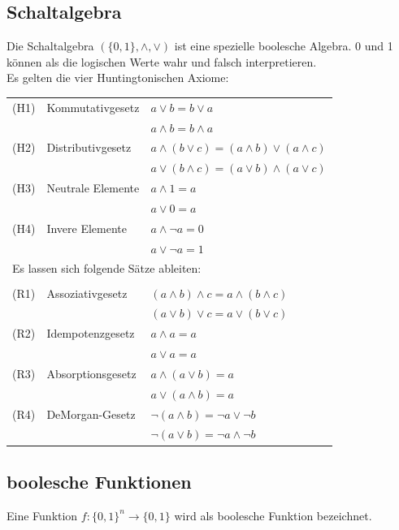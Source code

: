 \documentclass[12pt]{article}
\begin{document}
\subsection{Schaltalgebra}
Die Schaltalgebra $(\{0,1\}, \land, \lor)$ ist eine spezielle boolesche Algebra. 0 und 1 können als die logischen Werte wahr und falsch interpretieren. \\
Es gelten die vier Huntingtonischen Axiome: \\
\newline
\begin{tabular}{l l l}
    (H1) & Kommutativgesetz & $a \lor b = b \lor a$ \\
    & & $a \land b = b \land a$ \\
    (H2) & Distributivgesetz & $a \land (b \lor c) = (a \land b) \lor (a \land c)$ \\
    & & $a \lor (b \land c) = (a \lor b) \land (a \lor c)$ \\
    (H3) & Neutrale Elemente & $a \land 1 = a$ \\
    & & $a \lor 0 = a$ \\
    (H4) & Invere Elemente & $a \land \neg a = 0$ \\
    & & $a \lor \neg a = 1$ \\
    \multicolumn{3}{l}{Es lassen sich folgende Sätze ableiten:} \\ \\
    (R1) & Assoziativgesetz & $(a \land b) \land c = a \land (b \land c)$ \\
    & & $(a \lor b) \lor c = a \lor (b \lor c)$ \\
    (R2) & Idempotenzgesetz & $a \land a = a$ \\
    & & $a \lor a = a$ \\
    (R3) & Absorptionsgesetz & $a \land (a \lor b) = a$ \\
    & & $a \lor (a \land b) = a$ \\
    (R4) & DeMorgan-Gesetz & $\neg(a \land b) = \neg a \lor \neg b$ \\
    & & $\neg(a \lor b) = \neg a \land \neg b$ \\
\end{tabular}
\subsection{boolesche Funktionen}
Eine Funktion $f: \{0,1\}^n \rightarrow \{0,1\}$ wird als boolesche Funktion bezeichnet.
\end{document}
